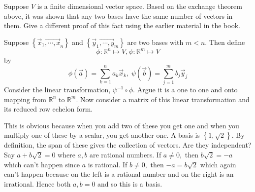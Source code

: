 \documentclass{ximera}
\begin{document}
\begin{problem}\label{prb:10.61} Suppose $V$ is a finite dimensional vector space. Based on the
exchange theorem above, it was shown that any two bases have the same number
of vectors in them. Give a different proof of this fact using the earlier
material in the book. 
\begin{hint}Suppose $\left\{ \vec{x}_{1}\vec{
,\cdots ,x}_{n}\right\} $ and $\left\{ \vec{y}_{1}\vec{,\cdots ,y}
_{m}\right\} $ are two bases with $m<n.$ Then define
\begin{equation*}
\phi :\mathbb{R}^{n}\mapsto V,\psi :\mathbb{R}^{m}\mapsto V
\end{equation*}
by
\begin{equation*}
\phi \left( \vec{a}\right) = \sum_{k=1}^{n}a_{k}\vec{x}
_{k},\;\psi \left( \vec{b}\right) = \sum_{j=1}^{m}b_{j}\vec{y}_{j}
\end{equation*}
Consider the linear transformation, $\psi ^{-1}\circ \phi .$ Argue it is a
one to one and onto mapping from $\mathbb{R}^{n}$ to $\mathbb{R}^{m}.$ Now
consider a matrix of this linear transformation and its reduced row echelon form.
\end{hint}
\begin{hint}
This is obvious because
when you add two of these you get one and when you multiply one of these by
a scalar, you get another one. A basis is $\left\{ 1,\sqrt{2}\right\} $. By
definition, the span of these gives the collection of vectors. Are they
independent? Say $a+b\sqrt{2}=0$ where $a,b$ are rational numbers. If $a\neq
0,$ then $b\sqrt{2}=-a$ which can't happen since $a$ is rational. If $b\neq
0,$ then $-a=b\sqrt{2}$ which again can't happen because on the left is a
rational number and on the right is an irrational. Hence both $a,b=0$ and so
this is a basis.
\end{hint}
\end{problem}

\end{document}

